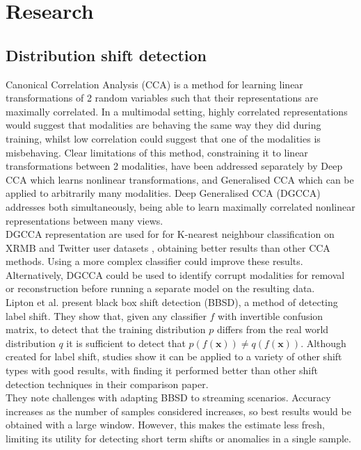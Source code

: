 \chapter{Research}

\section{Distribution shift detection}
Canonical Correlation Analysis (CCA) \cite{CCA} is a method for learning linear transformations of 2 random variables such that their representations are maximally correlated. In a multimodal setting, highly correlated representations would suggest that modalities are behaving the same way they did during training, whilst low correlation could suggest that one of the modalities is misbehaving. Clear limitations of this method, constraining it to linear transformations between 2 modalities, have been addressed separately by Deep CCA \cite{DCCA} which learns nonlinear transformations, and Generalised CCA \cite{GCCA} which can be applied to arbitrarily many modalities. Deep Generalised CCA (DGCCA) \cite{DGCCA} addresses both simultaneously, being able to learn maximally correlated nonlinear representations between many views.\\

DGCCA representation are used for for K-nearest neighbour classification on XRMB and Twitter user datasets \cite{DGCCA}, obtaining better results than other CCA methods. Using a more complex classifier could improve these results. Alternatively, DGCCA could be used to identify corrupt modalities for removal or reconstruction before running a separate model on the resulting data.\\

Lipton et al. \cite{BBSD} present black box shift detection (BBSD), a method of detecting label shift. They show that, given any classifier $f$ with invertible confusion matrix, to detect that the training distribution $p$ differs from the real world distribution $q$ it is sufficient to detect that $p(f(\boldsymbol{x}))\neq q(f(\boldsymbol{x}))$. Although created for label shift, studies show it can be applied to a variety of other shift types with good results, with \cite{failingloudly} finding it performed better than other shift detection techniques in their comparison paper.\\

They note challenges with adapting BBSD to streaming scenarios. Accuracy increases as the number of samples considered increases, so best results would be obtained with a large window. However, this makes the estimate less fresh, limiting its utility for detecting short term shifts or anomalies in a single sample.\\

